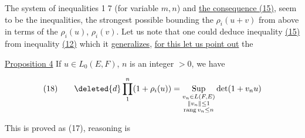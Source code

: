 The system of inequalities \textcircled{17} (for variable $m,n$) and \uline{the consequence (15)}, seem to be the inequalities, the strongest possible bounding the  $\rho_i(u+v)$ from above in terms of the $\rho_i(u)$, $\rho_i(v)$. Let us note that one could deduce   inequality \uline{(15)} from inequality \uline{(12)} which it \uline{generalizes}, \uline{for this let us point out} the 

\uline{Proposition 4} If $u\in L_0(E,F)$,  $n$ is an integer $>0$, we have

\[
\begin{array}{@{}l@{\qquad}l@{}}
(18) & \displaystyle \deleted{d}\prod_1^n(1+\rho_i(u))=\operatorname*{Sup}_{\substack{v_n\in L(F,E)\\\lVert v_n\rVert\leq1\\\operatorname{rang}v_n\leq n}}\det(1+v_nu)
\end{array}
\]

This   is proved as (17),   reasoning is  



